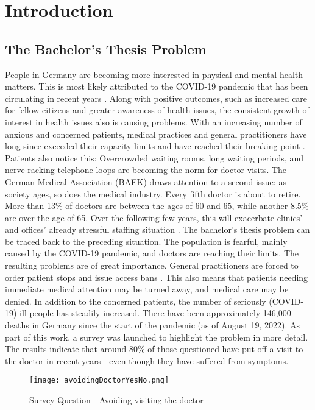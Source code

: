 
\chapter{Introduction}

\section{The Bachelor's Thesis Problem}
People in Germany are becoming more interested in physical and mental health matters. This is most likely attributed to the COVID-19 pandemic that has been circulating in recent years \cite{.bahn-bonn}. Along with positive outcomes, such as increased care for fellow citizens \cite{.bahn-bonn} and greater awareness of health issues, the consistent growth of interest in health issues also is causing problems. With an increasing number of anxious and concerned patients, medical practices and general practitioners have long since exceeded their capacity limits and have reached their breaking point \cite{.sok}. Patients also notice this: Overcrowded waiting rooms, long waiting periods, and nerve-racking telephone loops are becoming the norm for doctor visits. The German Medical Association (BAEK) draws attention to a second issue: as society ages, so does the medical industry. Every fifth doctor is about to retire. More than 13\% of doctors are between the ages of 60 and 65, while another 8.5\% are over the age of 65. Over the following few years, this will exacerbate clinics' and offices' already stressful staffing situation \cite{.blatt}. 
The bachelor's thesis problem can be traced back to the preceding situation. The population is fearful, mainly caused by the COVID-19 pandemic, and doctors are reaching their limits. The resulting problems are of great importance. General practitioners are forced to order patient stops and issue access bans \cite{.sok}. This also means that patients needing immediate medical attention may be turned away, and medical care may be denied. In addition to the concerned patients, the number of seriously (COVID-19) ill people has steadily increased. There have been approximately 146,000 deaths in Germany since the start of the pandemic (as of August 19, 2022). \cite{.rki} As part of this work, a survey was launched to highlight the problem in more detail. The results indicate that around 80\% of those questioned have put off a visit to the doctor in recent years - even though they have suffered from symptoms.
\begin{figure}[H]
	\centering
	\texttt{[image: avoidingDoctorYesNo.png]}
	\caption[Survey Question]{Survey Question - Avoiding visiting the doctor}
\end{figure}

